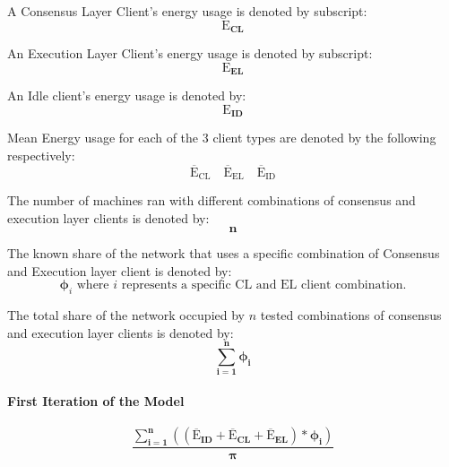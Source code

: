 A Consensus Layer Client's energy usage is denoted by subscript:
\begin{equation*}
    \boldsymbol{\mathrm{E}_{CL}}
\end{equation*}

An Execution Layer Client's energy usage is denoted by subscript:
\begin{equation*}
    \boldsymbol{\mathrm{E}_{EL}}
\end{equation*}
 
 An Idle client's energy usage is denoted by: \begin{equation*}
    \boldsymbol{\mathrm{E}_{ID}}
\end{equation*} 

Mean Energy usage for each of the 3 client types are denoted by the following respectively: 
\begin{equation*}
  \boldsymbol{\mathrm{{\overline{E}}_{CL}}}\quad      \boldsymbol{\mathrm{{\overline{E}}_{EL}}}\quad  \boldsymbol{\mathrm{{\overline{E}}_{ID}}}   
\end{equation*}

The number of machines ran with different combinations of consensus and execution layer clients is denoted by:
\begin{equation*}
    \boldsymbol{n}
\end{equation*}

The known share of the network that uses a specific combination of Consensus and Execution layer client is denoted by:
\begin{equation*}
    \boldsymbol{\phi}_{i} \text{ where } {i} \text{ represents a specific CL and EL client combination.}
\end{equation*}

The total share of the network occupied by ${n}$ tested combinations of consensus and execution layer clients is denoted by:
\begin{equation*}
    \boldsymbol{\displaystyle\sum\limits_{i=1}^{n}{\phi_{i}}}
\end{equation*}

\paragraph{First Iteration of the Model}

\begin{equation}
\boldsymbol{\frac{\displaystyle\sum\limits_{i=1}^{n}{ \left({\left(\mathrm{\overline{E}}_{ID} + \mathrm{\overline{E}}_{CL} + \mathrm{\overline{E}}_{EL}\right)} * {\phi_{i}} \right)}}
 {\pi}}
\end{equation}



